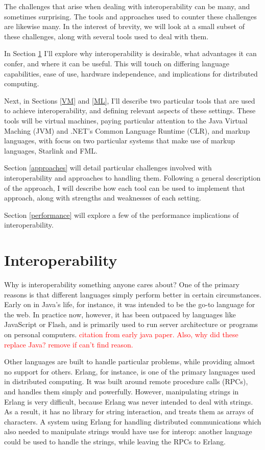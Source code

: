 \documentclass{sig-alternate}
\newcommand{\mycomment}[1]{\textcolor{red}{#1}}
\begin{document}
The challenges that arise when dealing with interoperability can be many, and sometimes surprising. The tools and approaches used to counter these challenges are likewise many. In the interest of brevity, we will look at a small subset of these challenges, along with several tools used to deal with them.

In Section \ref{Interop} I'll explore why interoperability is desirable, what advantages it can confer, and where it can be useful. This will touch on differing language capabilities, ease of use, hardware independence, and implications for distributed computing.

Next, in Sections \ref{VM} and \ref{ML}, I'll describe two particular tools that are used to achieve interoperability, and defining relevant aspects of these settings. These tools will be virtual machines, paying particular attention to the Java Virtual Maching (JVM) and .NET's Common Language Runtime (CLR), and markup languages, with focus on two particular systems that make use of markup languages, Starlink and FML.

Section \ref{approaches} will detail particular challenges involved with interoperability and approaches to handling them. Following a general description of the approach, I will describe how each tool can be used to implement that approach, along with strengths and weaknesses of each setting.

Section \ref{performance} will explore a few of the performance implications of interoperability.


\section{Interoperability}\label{Interop}
Why is interoperability something anyone cares about? One of the primary reasons is that different languages simply perform better in certain circumstances. Early on in Java's life, for instance, it was intended to be the go-to language for the web. In practice now, however, it has been outpaced by languages like JavaScript or Flash, and is primarily used to run server architecture or programs on personal computers. \mycomment{citation from early java paper. Also, why did these replace Java? remove if can't find reason.}

Other languages are built to handle particular problems, while providing almost no support for others. Erlang, for instance, is one of the primary languages used in distributed computing. It was built around remote procedure calls (RPCs), and handles them simply and powerfully. However, manipulating strings in Erlang is very difficult, because Erlang was never intended to deal with strings. As a result, it has no library for string interaction, and treats them as arrays of characters. A system using Erlang for handling distributed communications which also needed to manipulate strings would have use for interop: another language could be used to handle the strings, while leaving the RPCs to Erlang.
\end{document}
